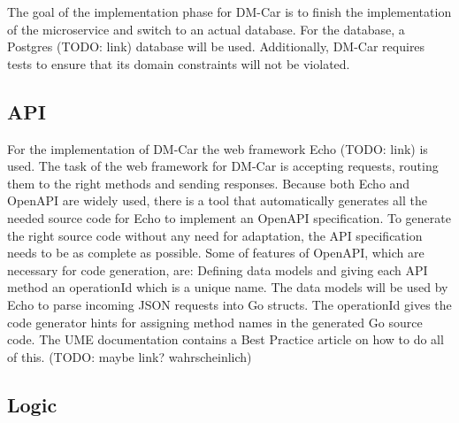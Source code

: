 The goal of the implementation phase for DM-Car is to finish the implementation of the microservice and switch to an actual database.
For the database, a Postgres (TODO: link) database will be used.
Additionally, DM-Car requires tests to ensure that its domain constraints will not be violated.

\subsection{API}

For the implementation of DM-Car the web framework Echo (TODO: link) is used.
The task of the web framework for DM-Car is accepting requests,
routing them to the right methods and sending responses.
Because both Echo and OpenAPI are widely used, there is a tool that automatically
generates all the needed source code for Echo to implement an OpenAPI specification.
To generate the right source code without any need for adaptation,
the API specification needs to be as complete as possible. Some of features
of OpenAPI, which are necessary for code generation, are:
Defining data models and giving each API method an operationId which is a unique name.
The data models will be used by Echo to parse incoming JSON requests
into Go structs. The operationId gives the code generator hints for assigning method names
in the generated Go source code.
The UME documentation contains a Best Practice article on how to do all of this. (TODO: maybe link? wahrscheinlich)


\subsection{Logic}



